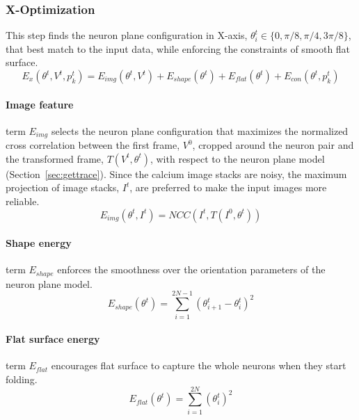 \documentclass[10pt,letterpaper]{article}
\begin{document}
\subsubsection{X-Optimization} \label{sec:x-optim}
This step finds the neuron plane configuration in X-axis, $\theta_i^t \in \{0, \pi/8, \pi/4, 3\pi/8 \}$, that best match to the input data, while enforcing the constraints of smooth flat surface.
\begin{equation}
E_{x}(\theta^t,V^t,p^t_k) = E_{img}(\theta^t,V^t) + E_{shape}(\theta^t) + E_{flat}(\theta^t) + E_{con}(\theta^t, p^t_k)
\end{equation} 

\paragraph{Image feature} term $E_{img}$ selects the neuron plane configuration that maximizes the normalized cross correlation \cite{Yoo2009} between the first frame, $V^0$, cropped around the neuron pair and the transformed frame, $T(V^t, \theta^t)$, with respect to the neuron plane model (Section~\ref{sec:gettrace}). Since the calcium image stacks are noisy, the maximum projection of image stacks, $I^t$, are preferred to make the input images more reliable. 
\begin{equation} \label{eq:Eimg}
E_{img}(\theta^t,I^t) = NCC(I^t, T(I^0, \theta^t))
\end{equation} 

\paragraph{Shape energy} term $E_{shape}$ enforces the smoothness over the orientation parameters of the neuron plane model.
\begin{equation}
E_{shape}(\theta^t) = \sum_{i=1}^{2N-1} (\theta_{i+1}^t - \theta_i^t)^2
\end{equation} 

\paragraph{Flat surface energy} term $E_{flat}$ encourages flat surface to capture the whole neurons when they start folding.
\begin{equation}
E_{flat}(\theta^t) = \sum_{i=1}^{2N} (\theta_i^t)^2
\end{equation} 
\end{document}
